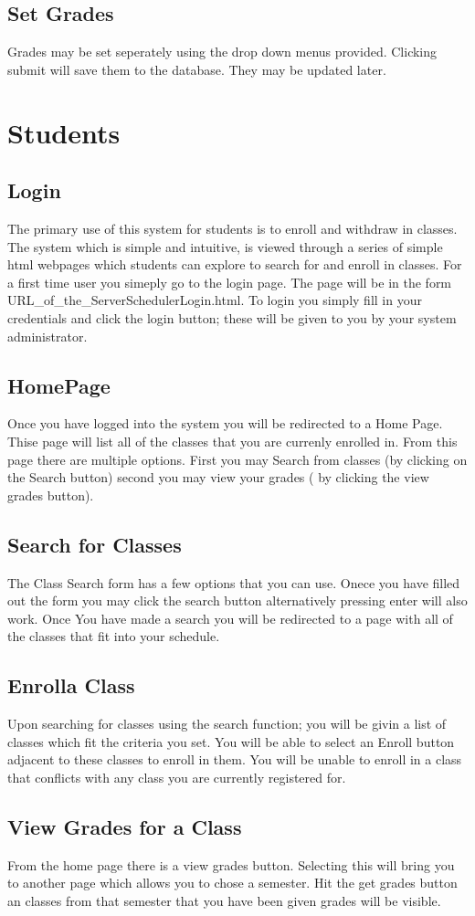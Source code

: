 \documentclass[11pt,oneside,a4paper]{article}
\begin{document}
\subsection{Set Grades}
Grades may be set seperately using the drop down menus provided.  Clicking submit will save
 them to the database.  They may be updated later.
\section{Students}
\subsection{Login}
The primary use of this system for students is to enroll and withdraw in classes.  
The system which is simple and intuitive, is viewed through a series of simple html webpages 
which students can explore to search for and enroll in classes.  For a first time user you 
simeply go to the login page.  The page will be in the form URL\_of\_the\_Server\/Scheduler\/Login.html. 
 To login you simply fill in your credentials and click the login button; these will be 
given to you by your system administrator.  
\subsection{HomePage}
Once you have logged into the system you will be redirected to a Home Page.  Thise page 
will list all of the classes that you are currenly enrolled in.  From this page there are 
multiple options. First you may Search from classes (by clicking on the Search button) 
second you may view your grades ( by clicking the view grades button).
\subsection{Search for Classes}
The Class Search form has a few options that you can use. Onece you have filled out the 
form you may click the search button alternatively pressing enter will also work. Once
You have made a search you will be redirected to a page with all of the classes that 
fit into your schedule.  
\subsection{Enrolla Class}
Upon searching for classes using the search function; you will be givin a list of classes which
fit the criteria you set.  You will be able to select an Enroll button adjacent to these classes
to enroll in them.  You will be unable to enroll in a class that conflicts with any class you are
 currently registered for. 
\subsection{View Grades for a Class}
From the home page there is a view grades button. Selecting this will bring you to another page
 which allows you to chose a semester.  Hit the get grades button an classes from that semester
 that you have been given grades will be visible.
\end{document}
